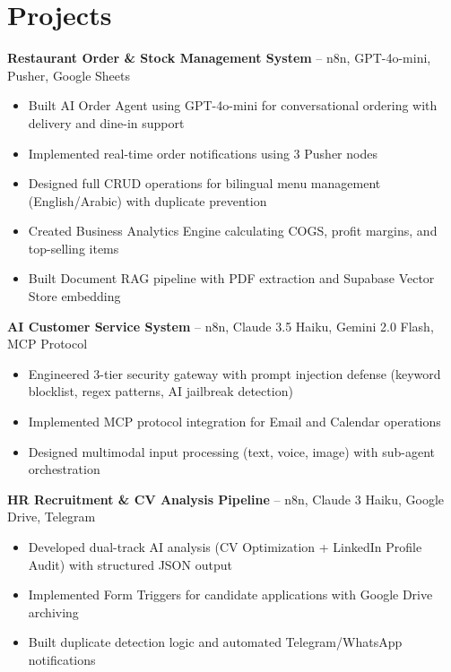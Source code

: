 \documentclass[11pt,a4paper]{article}
\begin{document}
\section*{Projects}

\textbf{Restaurant Order \& Stock Management System} -- n8n, GPT-4o-mini, Pusher, Google Sheets
\begin{itemize}[leftmargin=0.5cm, itemsep=1pt, topsep=2pt, label={-}]
    \item Built AI Order Agent using GPT-4o-mini for conversational ordering with delivery and dine-in support
    \item Implemented real-time order notifications using 3 Pusher nodes
    \item Designed full CRUD operations for bilingual menu management (English/Arabic) with duplicate prevention
    \item Created Business Analytics Engine calculating COGS, profit margins, and top-selling items
    \item Built Document RAG pipeline with PDF extraction and Supabase Vector Store embedding
\end{itemize}

\vspace{6pt}

\textbf{AI Customer Service System} -- n8n, Claude 3.5 Haiku, Gemini 2.0 Flash, MCP Protocol
\begin{itemize}[leftmargin=0.5cm, itemsep=1pt, topsep=2pt, label={-}]
    \item Engineered 3-tier security gateway with prompt injection defense (keyword blocklist, regex patterns, AI jailbreak detection)
    \item Implemented MCP protocol integration for Email and Calendar operations
    \item Designed multimodal input processing (text, voice, image) with sub-agent orchestration
\end{itemize}

\vspace{6pt}

\textbf{HR Recruitment \& CV Analysis Pipeline} -- n8n, Claude 3 Haiku, Google Drive, Telegram
\begin{itemize}[leftmargin=0.5cm, itemsep=1pt, topsep=2pt, label={-}]
    \item Developed dual-track AI analysis (CV Optimization + LinkedIn Profile Audit) with structured JSON output
    \item Implemented Form Triggers for candidate applications with Google Drive archiving
    \item Built duplicate detection logic and automated Telegram/WhatsApp notifications
\end{itemize}
\end{document}

